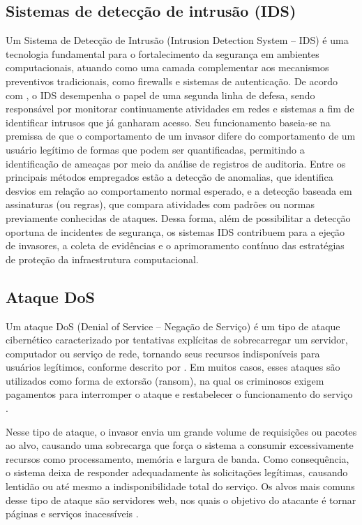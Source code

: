 \documentclass[
    12pt,                %
    openright,           %
    oneside,             %
    a4paper,             %
    english,             %
    brazil               %
]{abntex2}
\begin{document}
\subsection{Sistemas de detecção de intrusão (IDS)}
Um Sistema de Detecção de Intrusão (Intrusion Detection System – IDS) é uma tecnologia fundamental para o fortalecimento da segurança em ambientes computacionais, atuando como uma camada complementar aos mecanismos preventivos tradicionais, como firewalls e sistemas de autenticação. De acordo com , o IDS desempenha o papel de uma segunda linha de defesa, sendo responsável por monitorar continuamente atividades em redes e sistemas a fim de identificar intrusos que já ganharam acesso. Seu funcionamento baseia-se na premissa de que o comportamento de um invasor difere do comportamento de um usuário legítimo de formas que podem ser quantificadas, permitindo a identificação de ameaças por meio da análise de registros de auditoria. Entre os principais métodos empregados estão a detecção de anomalias, que identifica desvios em relação ao comportamento normal esperado, e a detecção baseada em assinaturas (ou regras), que compara atividades com padrões ou normas previamente conhecidas de ataques. Dessa forma, além de possibilitar a detecção oportuna de incidentes de segurança, os sistemas IDS contribuem para a ejeção de invasores, a coleta de evidências e o aprimoramento contínuo das estratégias de proteção da infraestrutura computacional.

\subsection{Ataque DoS}
Um ataque DoS (Denial of Service – Negação de Serviço) é um tipo de ataque cibernético caracterizado por tentativas explícitas de sobrecarregar um servidor, computador ou serviço de rede, tornando seus recursos indisponíveis para usuários legítimos, conforme descrito por . Em muitos casos, esses ataques são utilizados como forma de extorsão (ransom), na qual os criminosos exigem pagamentos para interromper o ataque e restabelecer o funcionamento do serviço \cite{Ouhssini2024}.

Nesse tipo de ataque, o invasor envia um grande volume de requisições ou pacotes ao alvo, causando uma sobrecarga que força o sistema a consumir excessivamente recursos como processamento, memória e largura de banda. Como consequência, o sistema deixa de responder adequadamente às solicitações legítimas, causando lentidão ou até mesmo a indisponibilidade total do serviço. Os alvos mais comuns desse tipo de ataque são servidores web, nos quais o objetivo do atacante é tornar páginas e serviços inacessíveis \cite{Ouhssini2024}.
\end{document}
